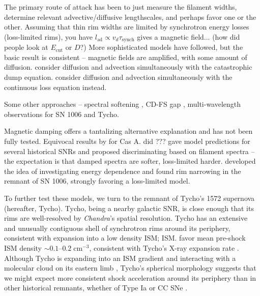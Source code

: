 \documentclass[iop, apj, numberedappendix, twocolappendix]{emulateapj}
\newcommand*{\mt}{\mathrm}
\newcommand*{\unit}[1]{\;\mt{#1}}  %
\newcommand*{\abt}{\mathord{\sim}} %
\newcommand*{\tsynch}{\tau_{\mt{synch}}}
\newcommand*{\Ecut}{E_{\mt{cut}}}
\begin{document}
The primary route of attack has been to just measure the filament widths,
determine relevant advective/diffusive lengthscales, and perhaps favor one or
the other.  Assuming that thin rim widths are limited by synchrotron energy
losses (loss-limited rims), you have $l_{\mt{ad}} \propto v_d \tsynch$
gives a magnetic field...
(how did people look at $\Ecut$ or $D$?)
\citet{bamba2003, vink2003, yamazaki2004, ballet2006}
More sophisticated models have followed, but the basic result is consistent --
magnetic fields are amplified, with some amount of diffusion.
\citet{parizot2006, araya2010} consider diffusion and advection simultaneously
with the catastrophic dump equation.
\citet{berezhko2003, berezhko2004, cassam-chenai2007, morlino2010, rettig2012}
consider diffusion and advection simultaneously with the continuous loss
equation instead.

Some other approaches -- spectral softening \citep{cassam-chenai2007}, CD-FS
gap \citep{warren2005}, multi-wavelength observations \citep{acero2010,
acciari2011, morlino2012} for SN 1006 and Tycho.

Magnetic damping offers a tantalizing alternative explanation and has not
been fully tested.  Equivocal results by \citet{araya2010} for Cas A.
\citet{marcowith2010} did ???
\citet{rettig2012} gave model predictions for several historical SNRs and
proposed discriminating based on filament spectra -- the
expectation is that damped spectra are softer, loss-limited harder.
\citet{ressler2014} developed the idea of investigating energy dependence and
found rim narrowing in the remnant of SN 1006, strongly favoring a loss-limited
model.

To further test these models, we turn to the remnant of Tycho's 1572 supernova
(hereafter, Tycho).  Tycho, being a nearby galactic SNR, is close enough that
its rims are well-resolved by \textit{Chandra}'s spatial resolution.  Tycho has
an extensive and unusually contiguous shell of synchrotron rims around its
periphery, consistent with expansion into a low density ISM; ISM.
\citet{williams2013} favor mean pre-shock ISM density $\abt 0.1$--$0.2
\unit{cm^{-3}}$, consistent with Tycho's X-ray expansion rate
\citep{katsuda2010}.  Although Tycho is expanding into an ISM gradient
\citep{williams2013} and interacting with a molecular cloud on its eastern limb
\citep{reynoso1999}, Tycho's spherical morphology suggests that we might expect
more consistent shock acceleration around its periphery than in other
historical remnants, whether of Type Ia or CC SNe .
\end{document}
